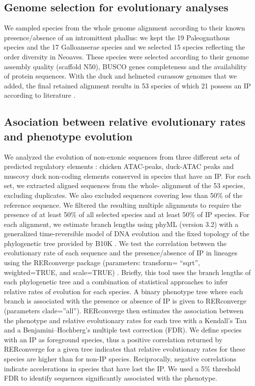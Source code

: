 \subsection*{Genome selection for evolutionary analyses}
We sampled species from the whole genome alignment according to their known presence/absence of an intromittent phallus: we kept the 19 Paleognathous species and the 17 Galloanserae species and we selected 15 species reflecting the order diversity in Neoaves. These species were selected according to their genome assembly quality (scaffold N50), BUSCO genes completeness and the availability of protein sequences. With the duck and helmeted curassow genomes that we added, the final retained alignment results in 53 species of which 21 possess an IP according to literature \citep{brennan_independent_2008}. 

\subsection*{Asociation between relative evolutionary rates and phenotype evolution}
We analyzed the evolution of non-exonic sequences from three different sets of predicted regulatory elements : chicken ATAC-peaks, duck-ATAC peaks and muscovy duck non-coding elements conserved in species that have an IP. For each set, we extracted aligned sequences from the whole- alignment of the 53 species, excluding duplicates. We also excluded sequences covering less than 50\% of the reference sequence. We filtered the resulting multiple alignments to require the presence of at least 50\% of all selected species and at least 50\% of IP species. For each alignment, we estimate branch lengths using phyML (version 3.2) \citep{guindon_new_2010} with a generalized time-reversible model of DNA evolution and the fixed topology of the phylogenetic tree provided by B10K \citep{feng_dense_2020}. We test the correlation between the evolutionary rate of each sequence and the presence/absence of IP in lineages using the RERconverge package (parameters: transform= “sqrt”, weighted=TRUE, and scale=TRUE) \citep{kowalczyk_rerconverge_2019}. Briefly, this tool uses the branch lengths of each phylogenetic tree and a combination of statistical approaches to infer relative rates of evolution for each species. A binary phenotype tree where each branch is associated with the presence or absence of IP is given to RERconverge (parameters clade=”all”). RERconverge then estimates the association between the phenotype and relative evolutionary rates for each tree with a Kendall’s Tau and a Benjamini–Hochberg’s multiple test correction (FDR). We define species with an IP as foreground species, thus a positive correlation returned by RERconverge for a given tree indicates that relative evolutionary rates for these species are higher than for non-IP species. Reciprocally, negative correlations indicate accelerations in species that have lost the IP. We used a 5\% threshold FDR to identify sequences significantly associated with the phenotype.

